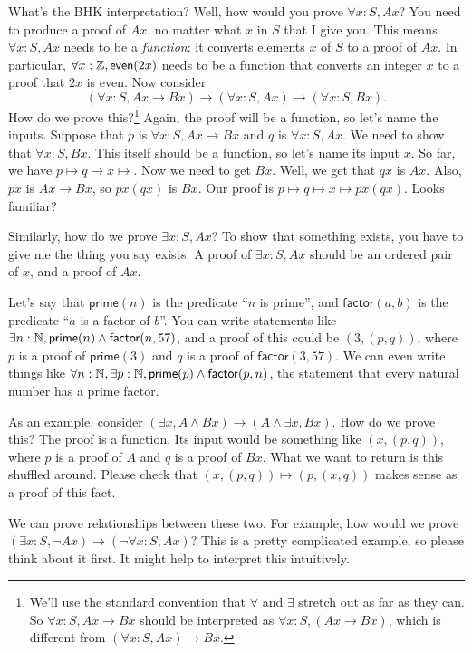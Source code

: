 \documentclass[11pt,paper=letter]{scrartcl}
\newcommand{\sf}{\mathsf}
\renewcommand{\land}{\wedge}
\renewcommand{\lnot}{\neg}
\begin{document}
What's the BHK interpretation? Well, how would you prove $\forall x: S, Ax$? You need to produce a proof of $Ax$, no matter what $x$ in $S$ that I give you. This means $\forall x: S, Ax$ needs to be a \emph{function}: it converts elements $x$ of $S$ to a proof of $Ax$. In particular, $\forall x: \ZZ, \sf{even}(2x)$ needs to be a function that converts an integer $x$ to a proof that $2x$ is even. Now consider \[
(\forall x:S, Ax \to Bx) \to (\forall x:S, Ax) \to (\forall x:S, Bx).\] How do we prove this?\footnote{We'll use the standard convention that $\forall$ and $\exists$ stretch out as far as they can. So $\forall x: S, Ax \to Bx$ should be interpreted as $\forall x: S, (Ax \to Bx)$, which is different from $(\forall x: S, Ax) \to Bx$.} Again, the proof will be a function, so let's name the inputs. Suppose that $p$ is $\forall x:S, Ax\to Bx$ and $q$ is $\forall x:S, Ax$. We need to show that $\forall x:S, Bx$. This itself should be a function, so let's name its input $x$. So far, we have $p \mapsto q \mapsto x \mapsto $. Now we need to get $Bx$. Well, we get that $qx$ is $Ax$. Also, $px$ is $Ax \to Bx$, so $px(qx)$ is $Bx$. Our proof is $p \mapsto q \mapsto x \mapsto px(qx)$. Looks familiar?

Similarly, how do we prove $\exists x: S, Ax$? To show that something exists, you have to give me the thing you say exists. A proof of $\exists x: S, Ax$ should be an ordered pair of $x$, and a proof of $Ax$.

Let's say that $\sf{prime}(n)$ is the predicate ``$n$ is prime'', and $\sf{factor}(a, b)$ is the predicate ``$a$ is a factor of $b$''. You can write statements like $\exists n: \NN, \sf{prime}(n) \land \sf{factor}(n, 57)$, and a proof of this could be $(3, (p, q))$, where $p$ is a proof of $\sf{prime}(3)$ and $q$ is a proof of $\sf{factor}(3, 57)$. We can even write things like $\forall n: \NN, \exists p: \NN, \sf{prime}(p) \land \sf{factor}(p, n)$, the statement that every natural number has a prime factor.

As an example, consider $(\exists x, A \land Bx) \to (A \land \exists x, Bx)$. How do we prove this? The proof is a function. Its input would be something like $(x, (p, q))$, where $p$ is a proof of $A$ and $q$ is a proof of $Bx$. What we want to return is this shuffled around. Please check that $(x, (p, q)) \mapsto (p, (x, q))$ makes sense as a proof of this fact.

We can prove relationships between these two. For example, how would we prove $(\exists x: S, \lnot Ax) \to (\lnot \forall x: S, Ax)$?  This is a pretty complicated example, so please think about it first. It might help to interpret this intuitively.
\end{document}
